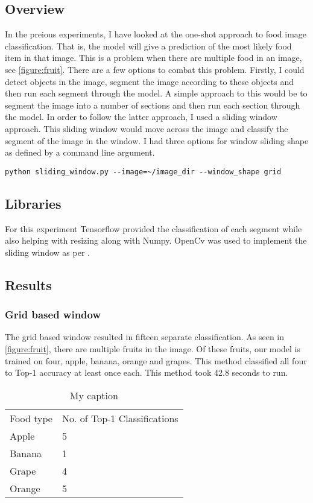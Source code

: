 \subsection*{Overview}
In the preious experiments, I have looked at the one-shot approach to food image
classification. That is, the model will give a prediction of the most likely
food item in that image. This is a problem when there are multiple food in an
image, see \ref{figure:fruit}. There are a few options to combat this problem. Firstly, I could detect
objects in the image, segment the image according to these objects and then run
each segment through the model. A simple approach to this would be to segment
the image into a number of sections and then run each section through the model.
In order to follow the latter approach, I used a sliding window approach. This
sliding window would move across the image and classify the segment of the image
in the window. I had three options for window sliding shape as defined by a
command line argument.

\begin{lstlisting}
python sliding_window.py --image=~/image_dir --window_shape grid
\end{lstlisting}

\subsection*{Libraries}
For this experiment Tensorflow provided the classification of each segment while
also helping with resizing along with Numpy. OpenCv was used to implement the
sliding window as per \parencite{slidingWindowTut}.

\subsection*{Results}
\subsubsection*{Grid based window}
The grid based window resulted in fifteen separate classification. As seen in
\ref{figure:fruit}, there are multiple fruits in the image. Of these fruits, our
model is trained on four, apple, banana, orange and grapes. This method
classified all four to Top-1 accuracy at least once each. This method took 42.8
seconds to run.

\begin{table}[]
	\centering
	\caption{My caption}
	\label{my-label}
	\begin{tabular}{ll}
		Food type & No. of Top-1 Classifications \\
		Apple     & 5                      \\
		Banana    & 1                      \\
		Grape     & 4                      \\
		Orange    & 5                     
	\end{tabular}
\end{table}

